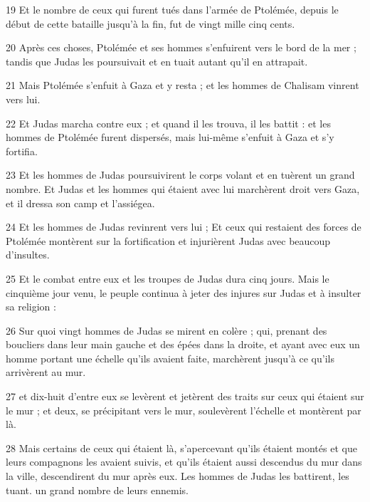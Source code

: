 \par 19 Et le nombre de ceux qui furent tués dans l'armée de Ptolémée, depuis le début de cette bataille jusqu'à la fin, fut de vingt mille cinq cents.

\par 20 Après ces choses, Ptolémée et ses hommes s'enfuirent vers le bord de la mer ; tandis que Judas les poursuivait et en tuait autant qu'il en attrapait.

\par 21 Mais Ptolémée s'enfuit à Gaza et y resta ; et les hommes de Chalisam vinrent vers lui.

\par 22 Et Judas marcha contre eux ; et quand il les trouva, il les battit : et les hommes de Ptolémée furent dispersés, mais lui-même s'enfuit à Gaza et s'y fortifia.

\par 23 Et les hommes de Judas poursuivirent le corps volant et en tuèrent un grand nombre. Et Judas et les hommes qui étaient avec lui marchèrent droit vers Gaza, et il dressa son camp et l'assiégea.

\par 24 Et les hommes de Judas revinrent vers lui ; Et ceux qui restaient des forces de Ptolémée montèrent sur la fortification et injurièrent Judas avec beaucoup d'insultes.

\par 25 Et le combat entre eux et les troupes de Judas dura cinq jours. Mais le cinquième jour venu, le peuple continua à jeter des injures sur Judas et à insulter sa religion :

\par 26 Sur quoi vingt hommes de Judas se mirent en colère ; qui, prenant des boucliers dans leur main gauche et des épées dans la droite, et ayant avec eux un homme portant une échelle qu'ils avaient faite, marchèrent jusqu'à ce qu'ils arrivèrent au mur.

\par 27 et dix-huit d'entre eux se levèrent et jetèrent des traits sur ceux qui étaient sur le mur ; et deux, se précipitant vers le mur, soulevèrent l'échelle et montèrent par là.

\par 28 Mais certains de ceux qui étaient là, s'apercevant qu'ils étaient montés et que leurs compagnons les avaient suivis, et qu'ils étaient aussi descendus du mur dans la ville, descendirent du mur après eux. Les hommes de Judas les battirent, les tuant. un grand nombre de leurs ennemis.

